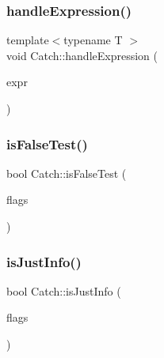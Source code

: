 \mbox{\label{namespace_catch_af2c93db76668a981e75ae835699efce7}} 
\subsubsection{\texorpdfstring{handle\+Expression()}{handleExpression()}\hspace{0.1cm}{\footnotesize\ttfamily [2/2]}}
{\footnotesize\ttfamily template$<$typename T $>$ \\
void Catch\+::handle\+Expression (\begin{DoxyParamCaption}\item[{\mbox{\hyperlink{class_catch_1_1_expr_lhs}{Expr\+Lhs}}$<$ T $>$ const \&}]{expr }\end{DoxyParamCaption})}

\mbox{\label{namespace_catch_a93ef4e3e307a2021ca0d41b32c0e54b0}} 
\subsubsection{\texorpdfstring{is\+False\+Test()}{isFalseTest()}}
{\footnotesize\ttfamily bool Catch\+::is\+False\+Test (\begin{DoxyParamCaption}\item[{int}]{flags }\end{DoxyParamCaption})\hspace{0.3cm}{\ttfamily [inline]}}

\mbox{\label{namespace_catch_a54b01af61673a3e1f21f31713639b180}} 
\subsubsection{\texorpdfstring{is\+Just\+Info()}{isJustInfo()}}
{\footnotesize\ttfamily bool Catch\+::is\+Just\+Info (\begin{DoxyParamCaption}\item[{int}]{flags }\end{DoxyParamCaption})}

\mbox{\label{namespace_catch_a5205869c81c06d3460759cb86676ae68}} 
